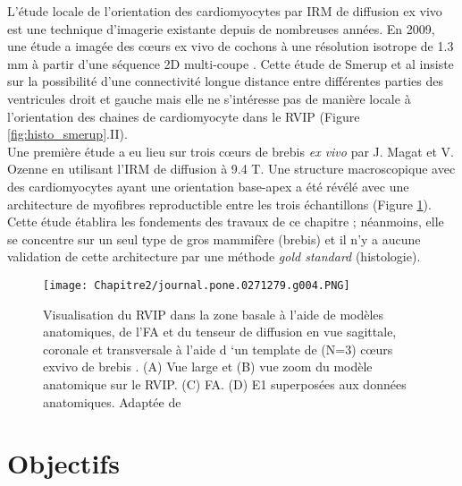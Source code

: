 L’étude locale de l’orientation des cardiomyocytes par IRM de diffusion ex vivo est une technique d’imagerie existante depuis de nombreuses années. En 2009, une étude a imagée des cœurs ex vivo de cochons à une résolution isotrope de 1.3 mm à partir d’une séquence 2D multi-coupe \cite{Smerup2008}.  Cette étude de Smerup et al insiste sur la possibilité d’une connectivité longue distance entre différentes parties des ventricules droit et gauche mais elle ne s’intéresse pas de manière locale à l’orientation des chaines de cardiomyocyte dans le RVIP (Figure \ref{fig:histo_smerup}.II).
 \\
Une première étude a eu lieu sur trois cœurs de brebis \textit{ex vivo} par J. Magat et V. Ozenne \cite{Magat2022} en utilisant l’IRM de diffusion à 9.4 T. Une structure macroscopique avec des cardiomyocytes ayant une orientation base-apex a été révélé avec une architecture de myofibres reproductible entre les trois échantillons (Figure \ref{fig:MAGAT}).  Cette étude établira les fondements des travaux de ce chapitre ; néanmoins, elle se concentre sur un seul type de gros mammifère (brebis) et il n’y a aucune validation de cette architecture par une méthode \textit{gold standard} (histologie).

\begin{figure}[!ht]
  \begin{center}
    \texttt{[image: Chapitre2/journal.pone.0271279.g004.PNG]}
  \end{center}
  \caption{Visualisation du RVIP dans la zone basale à l'aide de modèles anatomiques, de l'FA et du tenseur de diffusion en vue sagittale, coronale et transversale à l’aide d ‘un template de (N=3) cœurs exvivo de brebis . (A) Vue large et (B) vue zoom du modèle anatomique sur le RVIP. (C) FA. (D) E1 superposées aux données anatomiques. Adaptée de \cite{Magat2022}}
  \label{fig:MAGAT}
\end{figure}

\section{Objectifs}

